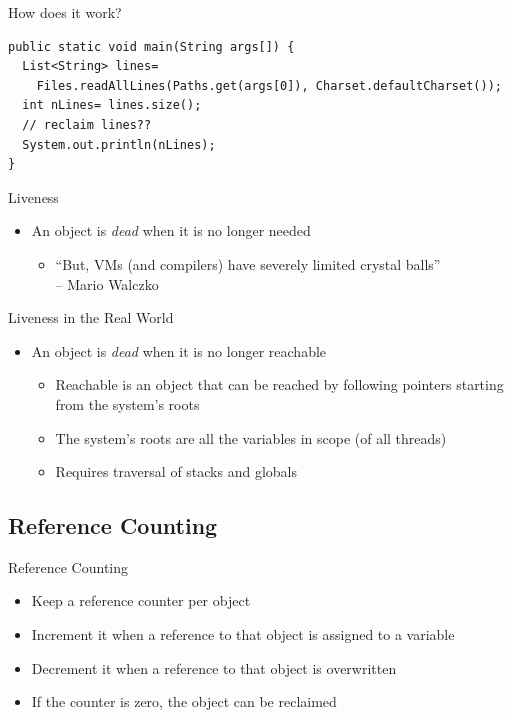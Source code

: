 \documentclass[
14pt,
aspectratio=169,
usenames,
dvipsnames,
x11names]{beamer}
\begin{document}
\begin{frame}[fragile]{How does it work?}
\begin{lstlisting}
public static void main(String args[]) {
  List<String> lines=
    Files.readAllLines(Paths.get(args[0]), Charset.defaultCharset());
  int nLines= lines.size();
  // reclaim lines??
  System.out.println(nLines);
}
\end{lstlisting}
\end{frame}

\begin{frame}{Liveness}
  \begin{itemize}
  \item An object is \textit{dead} when it is \alert{no longer needed}
    \pause
    \begin{itemize}
    \item ``But, VMs (and compilers) have severely limited crystal balls''\\
      \hfill -- Mario Walczko
    \end{itemize}
  \end{itemize}
\end{frame}

\begin{frame}{Liveness in the Real World}
  \begin{itemize}
  \item An object is \textit{dead} when it is \alert{no longer reachable}
    \begin{itemize}  \setlength{\itemsep}{\fill}
    \item Reachable is an object that can be reached by following pointers starting from the system's roots
    \item The system's roots are all the variables in scope (of all threads)
    \item Requires traversal of stacks and globals
    \end{itemize}
  \end{itemize}
\end{frame}


\subsection{Reference Counting}

\begin{frame}{Reference Counting}
  \begin{itemize}  \setlength{\itemsep}{\fill}
  \item Keep a reference \alert{counter per object}
  \item \alert{Increment} it when a reference to that object is assigned to a variable
  \item \alert{Decrement} it when a reference to that object is overwritten
  \item If the counter is \alert{zero}, the object \alert{can be reclaimed}
  \end{itemize}
\end{frame}
\end{document}
